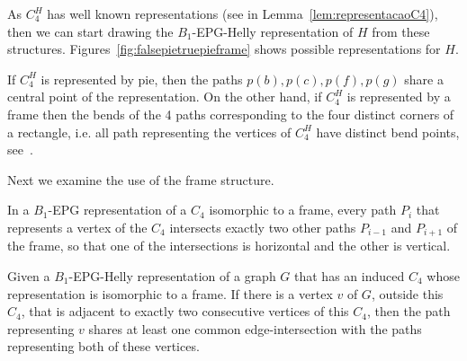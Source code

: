 \documentclass[runningheads]{llncs}
\begin{document}
As $C_4^{H}$ has well known representations (see in Lemma~\ref{lem:representacaoC4}), then we can start drawing the $B_{1}$-EPG-Helly representation of $H$ from these structures.  Figures~\ref{fig:falsepietruepieframe} shows possible representations for $H$.



If $C_4^{H}$ is represented by pie, then the paths $p(b), p(c), p(f), p(g)$ share a central point of the representation. On the other hand, if $C_4^{H}$ is represented by a frame then the bends of the 4 paths corresponding to the four distinct corners of a rectangle, i.e. all path representing the vertices of $C_4^{H}$ have distinct bend points, see~\cite{golumbic2009}.

Next we examine the use of the frame structure.


\begin{proposition}\label{lem:direcoesdiferentes}
In a $B_1$-EPG representation of a $C_4$ isomorphic to a frame, every path $P_i$ that represents a vertex of the $C_4$ intersects exactly two other paths $P_{i-1}$ and $P_{i+1}$ of the frame, so that one of the intersections is horizontal and the other is vertical. %
\end{proposition}


\begin{proposition}\label{lem:mesmaretasuporte}
Given a $B_1$-EPG-Helly representation of a graph $G$ that has an induced $C_4$ whose representation is isomorphic to a frame. If there is a vertex $v$ of $G$, outside this $C_4$, that is adjacent to exactly two consecutive vertices of this $C_4$, then the path representing $v$ shares at least one common edge-intersection with the paths representing both of these vertices.%
\end{proposition}

\end{document}
